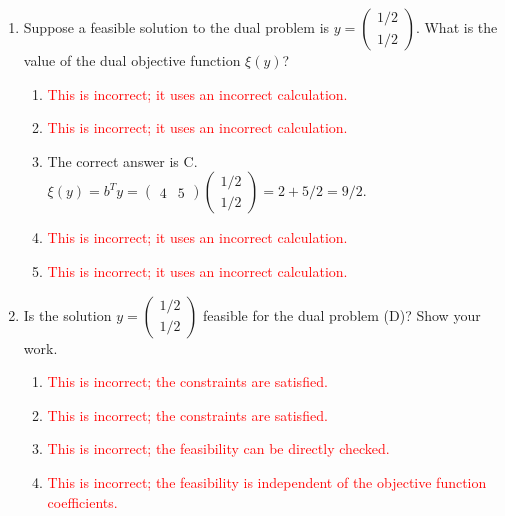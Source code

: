 \documentclass{article}%
\newcommand{\incorrect}[1]{\textcolor{red}{#1}}
\begin{document}
\begin{enumerate}
\begin{enumerate}
\begin{enumerate}
\item \incorrect{This is incorrect; the feasibility can be directly checked.}%
\item \incorrect{This is incorrect; the feasibility is independent of the objective function coefficients.}%
\item \incorrect{This is incorrect; the feasibility is independent of the right-hand side vector b.}%
\end{enumerate}%
\vspace{0.5em}%
\item Suppose a feasible solution to the dual problem is $y = \begin{pmatrix} 1/2 \\ 1/2 \end{pmatrix}$. What is the value of the dual objective function $\xi(y)$?%
\begin{enumerate}%
\item \incorrect{This is incorrect; it uses an incorrect calculation.}%
\item \incorrect{This is incorrect; it uses an incorrect calculation.}%
\item The correct answer is C. $\xi(y) = b^T y = \begin{pmatrix} 4 & 5 \end{pmatrix} \begin{pmatrix} 1/2 \\ 1/2 \end{pmatrix} = 2 + 5/2 = 9/2$.%
\item \incorrect{This is incorrect; it uses an incorrect calculation.}%
\item \incorrect{This is incorrect; it uses an incorrect calculation.}%
\end{enumerate}%
\vspace{0.5em}%
\item Is the solution $y = \begin{pmatrix} 1/2 \\ 1/2 \end{pmatrix}$ feasible for the dual problem (D)? Show your work.%
\begin{enumerate}%
\item \incorrect{This is incorrect; the constraints are satisfied.}%
\item \incorrect{This is incorrect; the constraints are satisfied.}%
\item \incorrect{This is incorrect; the feasibility can be directly checked.}%
\item \incorrect{This is incorrect; the feasibility is independent of the objective function coefficients.}%

\end{enumerate}
\end{enumerate}
\end{enumerate}
\end{document}
